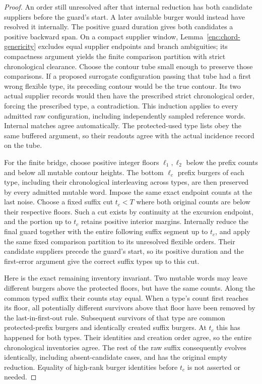 \documentclass[11pt]{article}
\numberwithin{equation}{section}
\theoremstyle{definition}
\theoremstyle{remark}
\newcommand{\1}{\mathbf 1}
\begin{document}
\begin{proof}
An order still unresolved after that internal reduction has both
candidate suppliers before the guard's start.  A later available
burger would instead have resolved it internally.  The positive
guard duration gives both candidates a positive backward span.
On a compact supplier window, Lemma~\ref{enc:chord-genericity}
excludes equal supplier endpoints and branch ambiguities; its
compactness argument yields the finite comparison partition with
strict chronological clearance.  Choose the contour tube small
enough to preserve those comparisons.  If a proposed surrogate
configuration passing that tube had a first wrong flexible type,
its preceding contour would be the true contour.  Its two actual
supplier records would then have the prescribed strict chronological
order, forcing the prescribed type, a contradiction.  This induction
applies to every admitted raw configuration, including independently
sampled reference words.  Internal matches agree automatically.
The protected-used type lists obey the same buffered argument, so
their readouts agree with the actual incidence record on the tube.

For the finite bridge, choose positive integer floors \(\ell_1,\ell_2\)
below the prefix counts and below all mutable contour heights.
The bottom \(\ell_c\) prefix burgers of each type, including their
chronological interleaving across types, are then preserved by every
admitted mutable word.  Impose the same exact endpoint counts at the
last noise.  Choose a fixed suffix cut \(t_c<T\) where both original
counts are below their respective floors.  Such a cut exists by
continuity at the excursion endpoint, and the portion up to \(t_c\)
retains positive interior margins.  Internally reduce the final guard
together with the entire following suffix segment up to \(t_c\),
and apply the same fixed comparison partition to its unresolved
flexible orders.  Their candidate suppliers precede the guard's
start, so its positive duration and the first-error argument give
the correct suffix types up to this cut.

Here is the exact remaining inventory invariant.  Two mutable words
may leave different burgers above the protected floors, but have the
same counts.  Along the common typed suffix their counts stay equal.
When a type's count first reaches its floor, all potentially different
survivors above that floor have been removed by the last-in-first-out
rule.  Subsequent survivors of that type are common protected-prefix
burgers and identically created suffix burgers.  At \(t_c\) this has
happened for both types.  Their identities and creation order agree,
so the entire chronological inventories agree.  The rest of the raw
suffix consequently evolves identically, including absent-candidate
cases, and has the original empty reduction.  Equality of high-rank
burger identities before \(t_c\) is not asserted or needed.


\end{proof}
\end{document}
